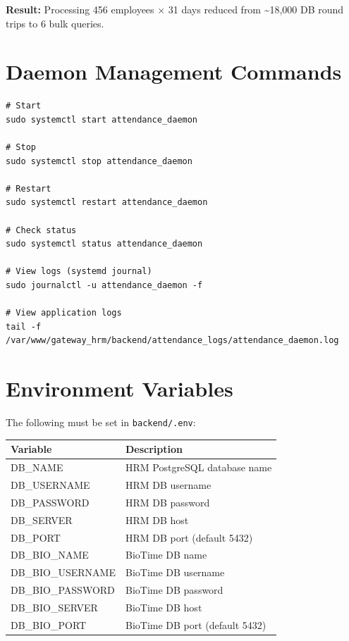 \documentclass[12pt,a4paper]{article}
\begin{document}
\textbf{Result:} Processing 456 employees × 31 days reduced from
\textasciitilde18,000 DB round trips to 6 bulk queries.

\section{Daemon Management Commands}

\begin{lstlisting}[style=bashstyle, caption={Common systemctl commands}]
# Start
sudo systemctl start attendance_daemon

# Stop
sudo systemctl stop attendance_daemon

# Restart
sudo systemctl restart attendance_daemon

# Check status
sudo systemctl status attendance_daemon

# View logs (systemd journal)
sudo journalctl -u attendance_daemon -f

# View application logs
tail -f /var/www/gateway_hrm/backend/attendance_logs/attendance_daemon.log
\end{lstlisting}

\section{Environment Variables}

The following must be set in \texttt{backend/.env}:

\begin{longtable}{>{\ttfamily}p{5cm} p{8cm}}
\toprule
\textbf{Variable} & \textbf{Description} \\
\midrule
\endhead
DB\_NAME        & HRM PostgreSQL database name \\
DB\_USERNAME    & HRM DB username \\
DB\_PASSWORD    & HRM DB password \\
DB\_SERVER      & HRM DB host \\
DB\_PORT        & HRM DB port (default 5432) \\
DB\_BIO\_NAME   & BioTime DB name \\
DB\_BIO\_USERNAME & BioTime DB username \\
DB\_BIO\_PASSWORD & BioTime DB password \\
DB\_BIO\_SERVER & BioTime DB host \\
DB\_BIO\_PORT   & BioTime DB port (default 5432) \\
\bottomrule
\end{longtable}
\end{document}
